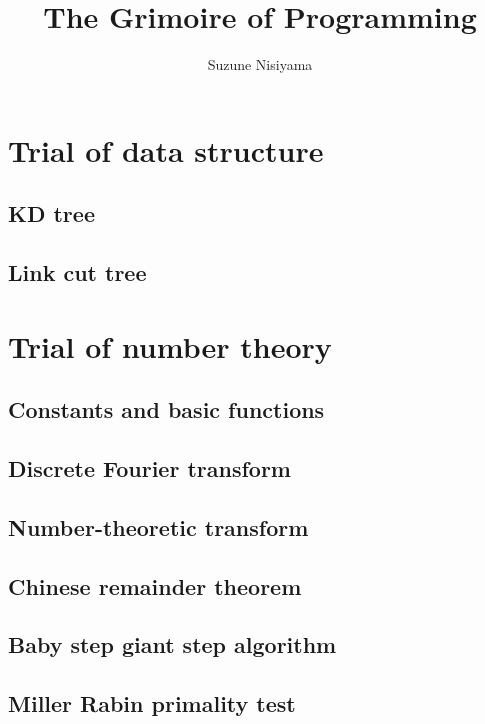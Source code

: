 \documentclass[UTF8,a4paper]{report}
\title{The Grimoire of Programming}
\date{}
\author{Suzune Nisiyama}
\begin{document}
	\tableofcontents
	\cleardoublepage
	\maketitle
	\chapter{Trial of data structure}
		\section{KD tree}
			
		\section{Link cut tree}
			
	\chapter{Trial of number theory}
		\section{Constants and basic functions}
			
		\section{Discrete Fourier transform}
			
		\section{Number-theoretic transform}
			
		\section{Chinese remainder theorem}
			
		\section{Baby step giant step algorithm}
			
		\section{Miller Rabin primality test}
			
\end{document}
